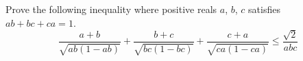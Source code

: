 Prove the following inequality where positive reals $a$, $b$, $c$ satisfies $ab+bc+ca=1$.
\[
        \frac{a+b}{\sqrt{ab(1-ab)}} + \frac{b+c}{\sqrt{bc(1-bc)}} + \frac{c+a}{\sqrt{ca(1-ca)}} \le \frac{\sqrt{2}}{abc}
    \]